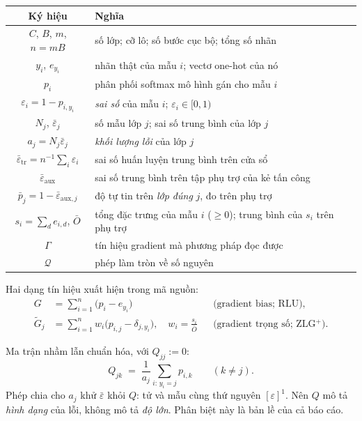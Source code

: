 \documentclass[11pt,a4paper]{article}
\theoremstyle{remark}
\newcommand{\quant}{\mathcal{Q}}
\newcommand{\epstr}{\bar\varepsilon_{\mathrm{tr}}}
\newcommand{\epsaux}{\bar\varepsilon_{\mathrm{aux}}}
\begin{document}
\begin{center}
\begin{tabular}{@{}cl@{}}
\toprule
\textbf{Ký hiệu} & \textbf{Nghĩa} \\
\midrule
$C$, $B$, $m$, $n=mB$ & số lớp; cỡ lô; số bước cục bộ; tổng số nhãn \\
$y_i$, $e_{y_i}$ & nhãn thật của mẫu $i$; vectơ one-hot của nó \\
$p_i$ & phân phối softmax mô hình gán cho mẫu $i$ \\
$\varepsilon_i=1-p_{i,y_i}$ & \emph{sai số} của mẫu $i$; $\varepsilon_i\in[0,1)$ \\
$N_j$, $\bar\varepsilon_j$ & số mẫu lớp $j$; sai số trung bình của lớp $j$ \\
$a_j=N_j\bar\varepsilon_j$ & \emph{khối lượng lỗi} của lớp $j$ \\
$\epstr=n^{-1}\sum_i\varepsilon_i$ & sai số huấn luyện trung bình trên cửa sổ \\
$\epsaux$ & sai số trung bình trên tập phụ trợ của kẻ tấn công \\
$\bar p_j=1-\bar\varepsilon_{\mathrm{aux},j}$ & độ tự tin trên \emph{lớp đúng} $j$, đo trên phụ trợ \\
$s_i=\sum_d e_{i,d}$, $\bar O$ & tổng đặc trưng của mẫu $i$ ($\ge0$); trung bình của $s_i$ trên phụ trợ \\
$\Gamma$ & tín hiệu gradient mà phương pháp đọc được \\
$\quant$ & phép làm tròn về số nguyên \\
\bottomrule
\end{tabular}
\end{center}

Hai dạng tín hiệu xuất hiện trong mã nguồn:
\begin{align}
G &= \sum_{i=1}^{n}\bigl(p_i-e_{y_i}\bigr) && \text{(gradient bias; RLU)},
\label{eq:G}\\
\tilde G_j &= \sum_{i=1}^{n} w_i\bigl(p_{i,j}-\delta_{j,y_i}\bigr),
 \quad w_i=\frac{s_i}{\bar O} && \text{(gradient trọng số; ZLG$^+$)}.
\label{eq:Gtilde}
\end{align}

Ma trận nhầm lẫn chuẩn hóa, với $Q_{jj}:=0$:
\begin{equation}
Q_{jk}\;=\;\frac{1}{a_j}\sum_{i:\,y_i=j}p_{i,k}\qquad(k\neq j).
\label{eq:Q}
\end{equation}
Phép chia cho $a_j$ khử $\bar\varepsilon$ khỏi $Q$: tử và mẫu cùng thứ nguyên
$[\varepsilon]^1$. Nên $Q$ mô tả \emph{hình dạng} của lỗi, không mô tả
\emph{độ lớn}. Phân biệt này là bản lề của cả báo cáo.
\end{document}
